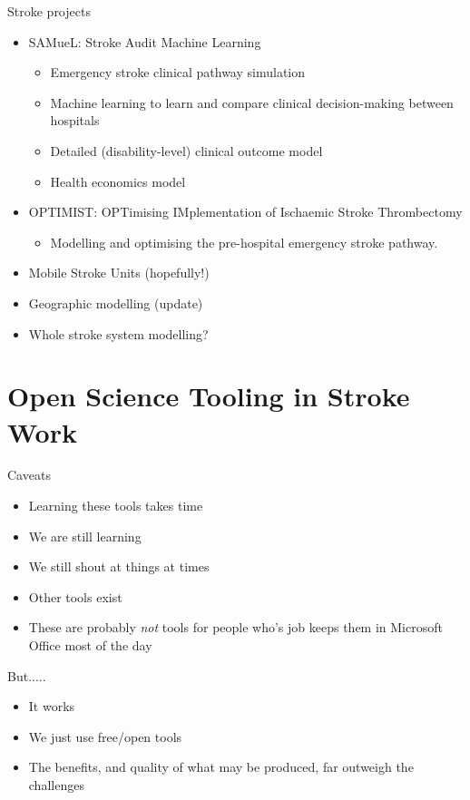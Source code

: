 \documentclass[xcolor={usenames,dvipsnames}]{beamer}
\begin{document}
\begin{frame}{Stroke projects}

\begin{itemize}
    \setlength\itemsep{2.5mm}
    \item SAMueL: Stroke Audit Machine Learning 
    \begin{itemize}
        \item Emergency stroke clinical pathway simulation
        \item Machine learning to learn and compare clinical decision-making between hospitals
        \item Detailed (disability-level) clinical outcome model
        \item Health economics model
    \end{itemize}
    \item OPTIMIST: OPTimising IMplementation of Ischaemic Stroke Thrombectomy
        \begin{itemize}
            \item Modelling and optimising the pre-hospital emergency stroke pathway.
        \end{itemize}
    \item Mobile Stroke Units (hopefully!)
    \item Geographic modelling (update)
    \item Whole stroke system modelling?
\end{itemize}
    
\end{frame}


\section{Open Science Tooling in Stroke Work}

\begin{frame}{Caveats}

\begin{itemize}
    \setlength\itemsep{2mm}
    \item Learning these tools takes time
    \item We are still learning
    \item We still shout at things at times
    \item Other tools exist
    \item These are probably \emph{not} tools for people who's job keeps them in Microsoft Office most of the day
\end{itemize}

\vspace{3mm}
But.....
\vspace{3mm}

\begin{itemize}
    \setlength\itemsep{2mm}
    \item It works
    \item We just use free/open tools
    \item The benefits, and quality of what may be produced, far outweigh the challenges
\end{itemize}

\end{frame}
\end{document}
